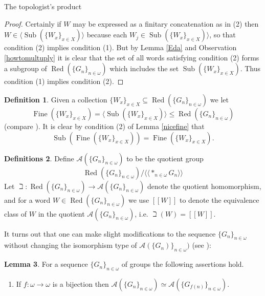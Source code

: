 \documentclass{amsart}
\theoremstyle{definition}\newtheorem{theorem}{Theorem}
\theoremstyle{definition}\newtheorem*{A}{Main Theorem}
\theoremstyle{definition}\newtheorem*{B}{Theorem \ref{elementaryequiv}}
\theoremstyle{definition}\newtheorem*{C}{Theorem \ref{continuous}}
\theoremstyle{definition}\newtheorem*{D}{Theorem \ref{bigisomorphism2}}
\theoremstyle{definition}\newtheorem{bigtheorem}{Main Theorem}
\numberwithin{theorem}{section}
\theoremstyle{definition}\newtheorem{corollary}[theorem]{Corollary}
\theoremstyle{definition}\newtheorem{proposition}[theorem]{Proposition}
\theoremstyle{definition}\newtheorem{definition}[theorem]{Definition}
\theoremstyle{definition}\newtheorem{question}[theorem]{Question}
\theoremstyle{definition}\newtheorem{example}[theorem]{Example}
\theoremstyle{definition}\newtheorem{remark}[theorem]{Remark}
\theoremstyle{definition}\newtheorem{note}[theorem]{Note}
\theoremstyle{definition}\newtheorem{lemma}[theorem]{Lemma}
\theoremstyle{definition}\newtheorem{fact}[theorem]{Fact}
\theoremstyle{definition}\newtheorem{define}[theorem]{Definition}
\theoremstyle{definition}\newtheorem{claim}[theorem]{Claim}
\theoremstyle{definition}\newtheorem{obs}[theorem]{Observation}
\theoremstyle{definition}\newtheorem{definitions}[theorem]{Definitions}
\newcommand{\Red}{\operatorname{Red}}
\newcommand{\Sub}{\operatorname{Sub}}
\newcommand{\Fine}{\operatorname{Fine}}
\begin{document}
\begin{section}{The topologist's product}
\begin{proof}  Certainly if $W$ may be expressed as a finitary concatenation as in (2) then $W \in \langle \Sub(\{W_x\}_{x \in X}) \rangle$ because each $W_j \in \Sub(\{W_x\}_{x \in X}) \rangle$, so that condition (2) implies condition (1).   But by Lemma \ref{Eda} and Observation \ref{howtomultuply} it is clear that the set of all words satisfying condition (2) forms a subgroup of $\Red(\{G_n\}_{n \in \omega})$ which includes the set $\Sub(\{W_x\}_{x \in X})$.  Thus condition (1) implies condition (2).
\end{proof}



\begin{definition}  Given a collection $\{W_x\}_{x \in X} \subseteq \Red(\{G_n\}_{n \in \omega})$ we let $$\Fine(\{W_x\}_{x \in X}) = \langle \Sub(\{W_x\}_{x \in X}) \rangle \leq \Red(\{G_n\}_{n \in \omega})$$ (compare \cite[page 600]{E2}).  It is clear by condition (2) of Lemma \ref{nicefine} that $$\Sub(\Fine(\{W_x\}_{x \in X})) = \Fine(\{W_x\}_{x \in X}).$$
\end{definition}




\begin{definitions}   Define $\mathcal{A}(\{G_n\}_{n \in \omega})$ to be the quotient group $$\Red(\{G_n\}_{n \in \omega})/\langle\langle *_{n \in \omega}G_n\rangle\rangle$$ Let $\beth: \Red(\{ G_n\}_{n \in \omega}) \rightarrow \mathcal{A}(\{G_n\}_{n \in \omega})$ denote the quotient homomorphism, and for a word $W \in \Red(\{G_n\}_{n \in \omega})$ we use $[[W]]$ to denote the equivalence class of $W$ in the quotient $\mathcal{A}(\{G_n\}_{n \in \omega})$, i.e. $\beth(W) = [[W]]$.
\end{definitions}


It turns out that one can make slight modifications to the sequence $\{G_n\}_{n \in \omega}$ without changing the isomorphism type of $\mathcal{A}(\{G_n)\}_{n\in \omega})$ (see \cite[Lemma 17]{CHM}):

\begin{lemma}\label{nicefactsaboutarch}  For a sequence $\{G_n\}_{n \in \omega}$ of groups the following assertions hold.

\begin{enumerate}

\item  If $f: \omega \rightarrow \omega$ is a bijection then $\mathcal{A}(\{G_n\}_{n\in \omega}) \simeq \mathcal{A}(\{G_{f(n)}\}_{n\in \omega})$.


\end{enumerate}
\end{lemma}
\end{section}
\end{document}

